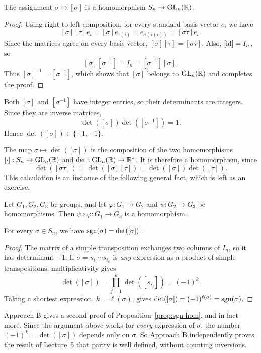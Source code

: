 \documentclass[reqno,11pt]{amsart}
\begin{document}
\begin{proposition}
The assignment $\sigma\mapsto[\sigma]$ is a homomorphism
$S_n\to\operatorname{GL}_n(\mathbb{R})$.
\end{proposition}

\begin{proof}
Using right-to-left composition, for every standard basis vector $e_i$ we have
\[
  [\sigma][\tau]e_i
  =[\sigma]e_{\tau(i)}
  =e_{\sigma(\tau(i))}
  =[\sigma\tau]e_i.
\]
Since the matrices agree on every basis vector,
$[\sigma][\tau]=[\sigma\tau]$. Also, $[\operatorname{id}]=I_n$, so
\[
  [\sigma][\sigma^{-1}]=I_n=[\sigma^{-1}][\sigma].
\]
Thus $[\sigma]^{-1}=[\sigma^{-1}]$, which shows that $[\sigma]$ belongs
to $\operatorname{GL}_n(\mathbb{R})$ and completes the proof.
\end{proof}

Both $[\sigma]$ and $[\sigma^{-1}]$ have integer entries, so their
determinants are integers. Since they are inverse matrices,
\[
  \det([\sigma])\det([\sigma^{-1}])=1.
\]
Hence $\det([\sigma])\in\{+1,-1\}$.

The map $\sigma\mapsto\det([\sigma])$ is the composition of the two
homomorphisms $[\cdot]:S_n\to\operatorname{GL}_n(\mathbb{R})$ and $\det:\operatorname{GL}_n(\mathbb{R})\to\mathbb{R}^*$. It is
therefore a homomorphism, since
\[
  \det([\sigma\tau])
  =\det([\sigma][\tau])
  =\det([\sigma])\det([\tau]).
\]
This calculation is an instance of the following general fact, which is
left as an exercise.

\begin{lemma}
Let $G_1,G_2,G_3$ be groups, and let $\varphi:G_1\to G_2$ and
$\psi:G_2\to G_3$ be homomorphisms. Then
$\psi\circ\varphi:G_1\to G_3$ is a homomorphism.
\end{lemma}

\begin{proposition}\label{prop:sgn-det}
For every $\sigma\in S_n$, we have $\operatorname{sgn}(\sigma)=\det([\sigma])$.
\end{proposition}

\begin{proof}
The matrix of a simple transposition exchanges two columns of $I_n$, so it
has determinant $-1$. If $\sigma=s_{i_1}\cdots s_{i_k}$ is \emph{any}
expression as a product of simple transpositions, multiplicativity gives
\[
  \det([\sigma])=\prod_{j=1}^k\det([s_{i_j}])=(-1)^k.
\]
Taking a shortest expression, $k=\ell(\sigma)$, gives
$\det([\sigma])=(-1)^{\ell(\sigma)}=\operatorname{sgn}(\sigma)$.
\end{proof}

\begin{remark}
Approach B gives a second proof of Proposition~\ref{prop:sgn-hom}, and in
fact more. Since the argument above works for \emph{every} expression of
$\sigma$, the number $(-1)^k=\det([\sigma])$ depends only on $\sigma$.
So Approach B independently proves the result of Lecture~5 that parity is
well defined, without counting inversions.
\end{remark}
\end{document}
